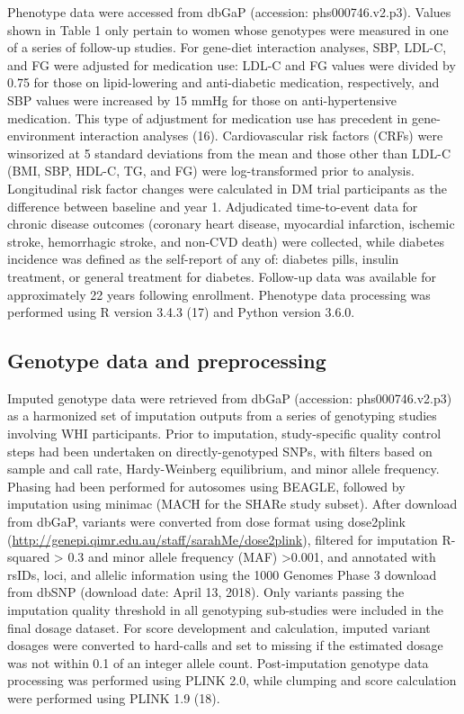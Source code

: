 \documentclass[]{article}
\begin{document}
Phenotype data were accessed from dbGaP (accession: phs000746.v2.p3).
Values shown in Table 1 only pertain to women whose genotypes were
measured in one of a series of follow-up studies. For gene-diet
interaction analyses, SBP, LDL-C, and FG were adjusted for medication
use: LDL-C and FG values were divided by 0.75 for those on
lipid-lowering and anti-diabetic medication, respectively, and SBP
values were increased by 15 mmHg for those on anti-hypertensive
medication. This type of adjustment for medication use has precedent in
gene-environment interaction analyses (16). Cardiovascular risk factors
(CRFs) were winsorized at 5 standard deviations from the mean and those
other than LDL-C (BMI, SBP, HDL-C, TG, and FG) were log-transformed
prior to analysis. Longitudinal risk factor changes were calculated in
DM trial participants as the difference between baseline and year 1.
Adjudicated time-to-event data for chronic disease outcomes (coronary
heart disease, myocardial infarction, ischemic stroke, hemorrhagic
stroke, and non-CVD death) were collected, while diabetes incidence was
defined as the self-report of any of: diabetes pills, insulin treatment,
or general treatment for diabetes. Follow-up data was available for
approximately 22 years following enrollment. Phenotype data processing
was performed using R version 3.4.3 (17) and Python version 3.6.0.

\hypertarget{genotype-data-and-preprocessing}{%
\subsection{Genotype data and
preprocessing}\label{genotype-data-and-preprocessing}}

Imputed genotype data were retrieved from dbGaP (accession:
phs000746.v2.p3) as a harmonized set of imputation outputs from a series
of genotyping studies involving WHI participants. Prior to imputation,
study-specific quality control steps had been undertaken on
directly-genotyped SNPs, with filters based on sample and call rate,
Hardy-Weinberg equilibrium, and minor allele frequency. Phasing had been
performed for autosomes using BEAGLE, followed by imputation using
minimac (MACH for the SHARe study subset). After download from dbGaP,
variants were converted from dose format using dose2plink
(\url{http://genepi.qimr.edu.au/staff/sarahMe/dose2plink}), filtered for
imputation R-squared \textgreater{} 0.3 and minor allele frequency (MAF)
\textgreater{}0.001, and annotated with rsIDs, loci, and allelic
information using the 1000 Genomes Phase 3 download from dbSNP (download
date: April 13, 2018). Only variants passing the imputation quality
threshold in all genotyping sub-studies were included in the final
dosage dataset. For score development and calculation, imputed variant
dosages were converted to hard-calls and set to missing if the estimated
dosage was not within 0.1 of an integer allele count. Post-imputation
genotype data processing was performed using PLINK 2.0, while clumping
and score calculation were performed using PLINK 1.9 (18).
\end{document}

